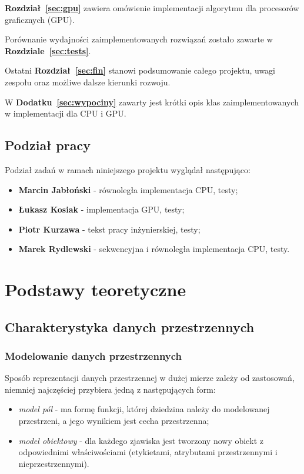 \documentclass[12pt]{article}
\begin{document}
\textbf{Rozdział~\ref{sec:gpu}} zawiera omówienie implementacji algorytmu dla procesorów graficznych (GPU).

Porównanie wydajności zaimplementowanych rozwiązań zostało zawarte w \textbf{Rozdziale~\ref{sec:tests}}.

Ostatni \textbf{Rozdział~\ref{sec:fin}} stanowi podsumowanie całego projektu, uwagi zespołu oraz możliwe dalsze kierunki rozwoju.

W \textbf{Dodatku~\ref{sec:wypociny}} zawarty jest krótki opis klas zaimplementowanych w implementacji dla CPU i GPU.

\subsection{Podział pracy}

Podział zadań w ramach niniejszego projektu wyglądał następująco:

\begin{itemize}
\item \textbf{Marcin Jabłoński} - równoległa implementacja CPU, testy;
\item \textbf{Łukasz Kosiak} - implementacja GPU, testy;
\item \textbf{Piotr Kurzawa} - tekst pracy inżynierskiej, testy;
\item \textbf{Marek Rydlewski} - sekwencyjna i równoległa implementacja CPU, testy.
\end{itemize}

\newpage

\section{Podstawy teoretyczne}
\label{sec:theory}

\subsection{Charakterystyka danych przestrzennych}

\subsubsection{Modelowanie danych przestrzennych}

Sposób reprezentacji danych przestrzennej w dużej mierze zależy od zastosowań, niemniej najczęściej przybiera jedną z następujących form:

\begin{itemize}
\item \textit{model pól} - ma formę funkcji, której dziedzina należy do modelowanej przestrzeni, a jego wynikiem jest cecha przestrzenna;
\item \textit{model obiektowy} - dla każdego zjawiska jest tworzony nowy obiekt z odpowiednimi właściwościami (etykietami, atrybutami przestrzennymi i nieprzestrzennymi).
\end{itemize}
\end{document}
